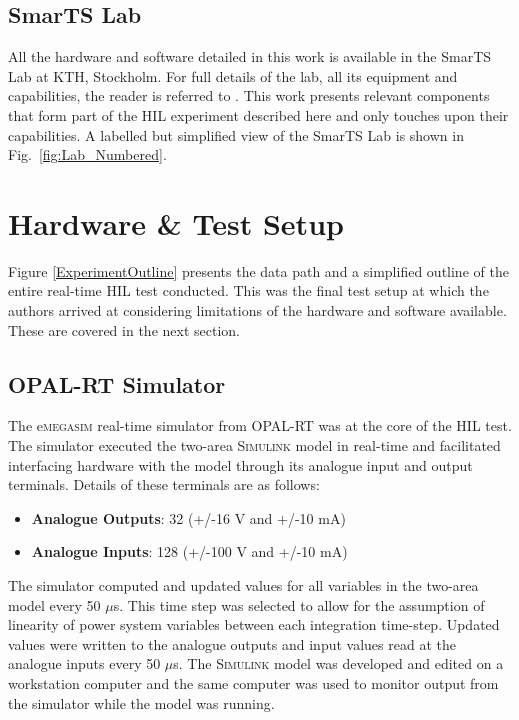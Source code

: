 \documentclass[conference]{IEEEtran}
\begin{document}
\subsection{SmarTS Lab}
All the hardware and software detailed in this work is available in the SmarTS Lab at KTH, Stockholm. For full details of the lab, all its equipment and capabilities, the reader is referred to \cite{SmarTSLab}. This work presents relevant components that form part of the HIL experiment described here and only touches upon their capabilities. A labelled but simplified view of the SmarTS Lab is shown in Fig.~\ref{fig:Lab_Numbered}.

\section{Hardware \& Test Setup}\label{hardware}

Figure \ref{ExperimentOutline} presents the data path and a simplified outline of the entire real-time HIL test conducted. This was the final test setup at which the authors arrived at considering limitations of the hardware and software available. These are covered in the next section.

\subsection{OPAL-RT Simulator}
The e\textsc{megasim} real-time simulator from OPAL-RT\cite{OPALemegasim} was at the core of the HIL test. The simulator executed the two-area \textsc{Simulink} model in real-time and facilitated interfacing hardware with the model through its analogue input and output terminals.  Details of these terminals are as follows:

\begin{itemize}
\item \textbf{Analogue Outputs}: 32 (+/-16 V and +/-10 mA)
\item \textbf{Analogue Inputs}: 128 (+/-100 V and +/-10 mA)
\end{itemize}

The simulator computed and updated values for all variables in the two-area model every 50 $\mu$s. This time step was selected to allow for the assumption of linearity of power system variables between each integration time-step. Updated values were written to the analogue outputs and input values read at the analogue inputs every 50 $\mu$s. The \textsc{Simulink} model was developed and edited on a workstation computer and the same computer was used to monitor output from the simulator while the model was running.
\end{document}

